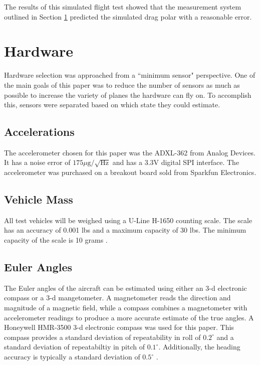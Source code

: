 \documentclass[]{aiaa-tc}%
\begin{document}
The results of this simulated flight test showed that the measurement system outlined in Section \ref{hardware} predicted the simulated drag polar with a reasonable error.

\section{Hardware}
\label{hardware}
Hardware selection was approached from a ``minimum sensor" perspective. One of the main goals of this paper was to reduce the number of sensors as much as possible to increase the variety of planes the hardware can fly on. To accomplish this, sensors were separated based on which state they could estimate.
\subsection*{Accelerations}
The accelerometer chosen for this paper was the ADXL-362 from Analog Devices. It has a noise error of $175\mu\text{g}/\sqrt{\text{Hz}}$ and has a 3.3V digital SPI interface\cite{adxl362DataSheet}. The accelerometer was purchased on a breakout board sold from Sparkfun Electronics.
\subsection*{Vehicle Mass}
All test vehicles will be weighed using a U-Line H-1650 counting scale. The scale has an accuracy of 0.001 lbs and a maximum capacity of 30 lbs. The minimum capacity of the scale is 10 grams \cite{U-Line}.
\subsection*{Euler Angles}
The Euler angles of the aircraft can be estimated using either an 3-d electronic compass or a 3-d mangetometer. A magnetometer reads the direction and magnitude of a magnetic field, while a compass combines a magnetometer with accelerometer readings to produce a more accurate estimate of the true angles. A Honeywell HMR-3500 3-d electronic compass was used for this paper. This compass provides a standard deviation of repeatability in roll of $0.2^\circ$ and a standard deviation of repeatabiltiy in pitch of $0.1^\circ$. Additionally, the heading accuracy is typically a standard deviation of $0.5^\circ$ \cite{honeywellHMR3500}. 
\end{document}

